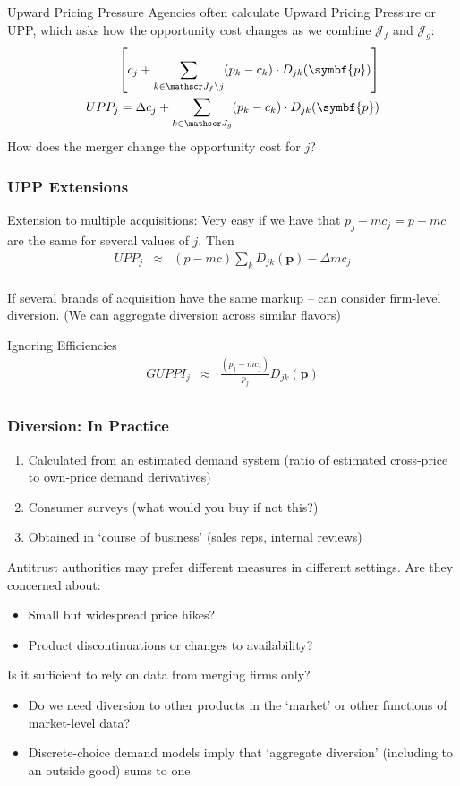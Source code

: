 \documentclass[aspectratio=169,10pt]{beamer}
\begin{document}
\begin{frame}{Upward Pricing Pressure}
Agencies often calculate \alert{Upward Pricing Pressure} or UPP, which asks how the opportunity cost \alert{changes} as we combine $\mathcal{J}_f$ and $\mathcal{J}_g$:
\begin{align*}
\left[ c_j + \sum_{k \in \calJ_{f} \setminus j}  (p_k-c_k) \cdot  D_{jk} (\symbf{p}) \right] \\
UPP_j = \Delta c_j + \sum_{k \in \calJ_{g}}  (p_k-c_k) \cdot  D_{jk} (\symbf{p})
\end{align*}
How does the merger change the \alert{opportunity cost} for $j$?
\end{frame}

\begin{frame}
\frametitle{UPP Extensions}
\begin{block}{Extension to multiple acquisitions:}
Very easy if we have that $p_j - mc_j = p - mc$ are the same for several values of $j$.  Then
\begin{eqnarray*}
UPP_j &\approx& (p - mc) \sum_k D_{jk}(\symbf{p}) -  \Delta mc_j \\
\end{eqnarray*}
\end{block}
If several brands of acquisition have the same markup -- can consider firm-level diversion. (We can aggregate diversion across similar flavors)
\begin{block}{Ignoring Efficiencies}
\begin{eqnarray*}
GUPPI_j &\approx& \frac{(p_j - mc_j)}{p_j} D_{jk}(\symbf{p}) \\
\end{eqnarray*}
\end{block}
\end{frame}


\begin{frame}
\frametitle{Diversion: In Practice}
\begin{enumerate}
\item Calculated from an estimated demand system (ratio of estimated cross-price to own-price demand derivatives)
\item Consumer surveys (what would you buy if not this?)
\item Obtained in `course of business' (sales reps, internal reviews)
\end{enumerate}
Antitrust authorities may prefer different measures in different settings. Are they concerned about:
\begin{itemize}
\item Small but widespread price hikes?
\item Product discontinuations or changes to availability?
\end{itemize}
Is it sufficient to rely on data from merging firms only?
\begin{itemize}
\item Do we need diversion to other products in the `market' or other functions of market-level data?
\item Discrete-choice demand models imply that `aggregate diversion' (including to an outside good) sums to one.
\end{itemize}
\end{frame}
\end{document}
